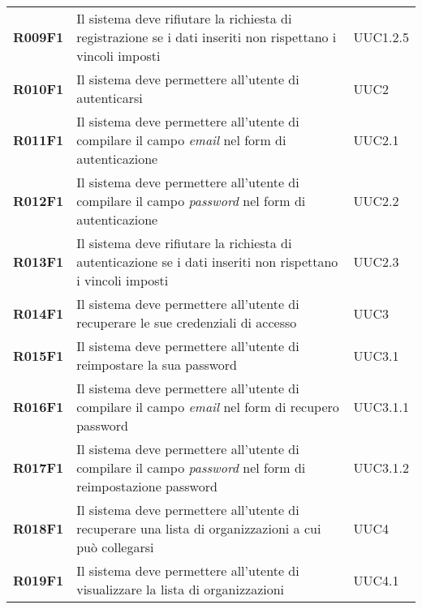 \documentclass[../analisi-dei-requisiti]{subfiles}
\begin{document}
\begin{longtable}[H]{>{\centering\bfseries}m{3cm} >{\centering}m{10cm} >{\centering\arraybackslash}m{3cm}}
  R009F1                  & Il sistema deve rifiutare la richiesta di registrazione se i dati inseriti non rispettano i vincoli imposti                                    & UUC1.2.5                      \\
  R010F1                  & Il sistema deve permettere all'utente di autenticarsi                                                                                          & UUC2                          \\
  R011F1                  & Il sistema deve permettere all'utente di compilare il campo \textit{email} nel form di autenticazione                                          & UUC2.1                        \\
  R012F1                  & Il sistema deve permettere all'utente di compilare il campo \textit{password} nel form di autenticazione                                       & UUC2.2                        \\
  R013F1                  & Il sistema deve rifiutare la richiesta di autenticazione se i dati inseriti non rispettano i vincoli imposti                                   & UUC2.3                        \\
  R014F1                  & Il sistema deve permettere all'utente di recuperare le sue credenziali di accesso                                                              & UUC3                          \\
  R015F1                  & Il sistema deve permettere all'utente di reimpostare la sua password                                                                           & UUC3.1                        \\
  R016F1                  & Il sistema deve permettere all'utente di compilare il campo \textit{email} nel form di recupero password                                       & UUC3.1.1                      \\
  R017F1                  & Il sistema deve permettere all'utente di compilare il campo \textit{password} nel form di reimpostazione password                              & UUC3.1.2                      \\
  R018F1                  & Il sistema deve permettere all'utente di recuperare una lista di organizzazioni a cui può collegarsi                                           & UUC4                          \\
  R019F1                  & Il sistema deve permettere all'utente di visualizzare la lista di organizzazioni                                                               & UUC4.1                        \\

\end{longtable}
\end{document}
